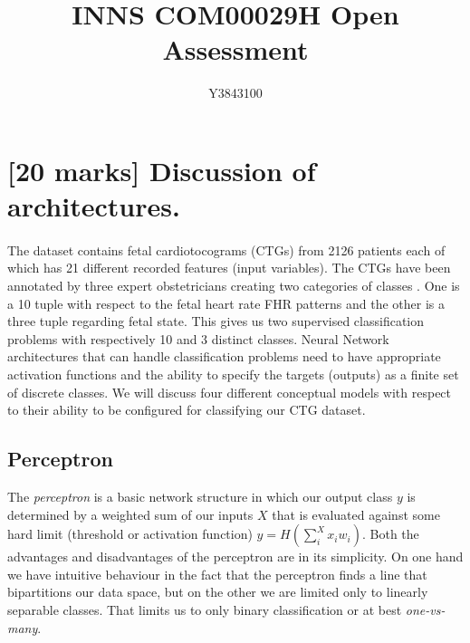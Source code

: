 \documentclass[11pt,a4paper]{article}
\title{INNS COM00029H Open Assessment}
\author{Y3843100}
\date{\vspace{-5ex}}
\begin{document}


\maketitle


\section{[20 marks] Discussion of architectures.}
\label{sec:discussion}
\paragraph{}
The dataset contains fetal cardiotocograms (CTGs) from 2126 patients each of which has 21 different recorded features (input variables). The CTGs have been annotated by three expert obstetricians creating two categories of classes \autocite{Campos:2000}. One is a 10 tuple with respect to the fetal heart rate FHR patterns and the other is a three tuple regarding fetal state. This gives us two supervised classification problems with respectively 10 and 3 distinct classes. Neural Network architectures that can handle classification problems need to have appropriate activation functions and the ability to specify the targets (outputs) as a finite set of discrete classes. We will discuss four different conceptual models with respect to their ability to be configured for classifying our CTG dataset.

\subsection{Perceptron}
The \textit{perceptron} is a basic network structure in which our output class \(y\) is determined by a weighted sum of our inputs \(X\) that is evaluated against some hard limit (threshold or activation function) \(y = H(\sum_{i}^{X} x_i w_i)\). Both the advantages and disadvantages of the perceptron are in its simplicity. On one hand we have intuitive behaviour in the fact that the perceptron finds a line that bipartitions our data space, but on the other we are limited only to linearly separable classes. That limits us to only binary classification or at best \textit{one-vs-many}.
\end{document}
